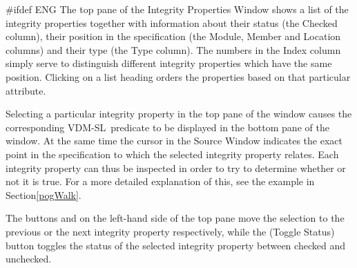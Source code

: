 \documentclass[\pformat,12pt]{article}
\newcommand{\vdmslpp}{VDM-SL}
\newcommand{\vdmslpp}{VDM++}
\newcommand{\guicmd}[1]{{\sf #1}}
\newcommand{\guicmd}[1]{{\gt #1}}
\begin{document}
#ifdef ENG
The top pane of the \guicmd{Integrity Properties Window} shows a list
of the integrity properties together with information about their
status (the \guicmd{Checked} column), their position in the
specification (the \guicmd{Module}, \guicmd{Member} and
\guicmd{Location} columns) and 
their type (the \guicmd{Type} column). The numbers in the
\guicmd{Index} column simply serve to distinguish different integrity
properties which have the same position. Clicking on a list heading
orders the properties based on that particular attribute.

Selecting a particular integrity property in the top pane of the
window causes the corresponding \vdmslpp\ predicate to be displayed in
the bottom pane of the window. At the same time the cursor in the
\guicmd{Source Window} indicates the exact point in the specification to
which the selected integrity property relates. Each integrity property
can thus be inspected in order to try to determine whether or not it
is true. For a more detailed explanation of this, see the example in
Section\ref{pogWalk}.

The buttons 
 and
 on the
left-hand side of the top pane move the selection to the previous or
the next integrity property respectively, while the 
(\guicmd{Toggle Status}) button toggles the status of the selected
integrity property between checked and unchecked.
\end{document}
